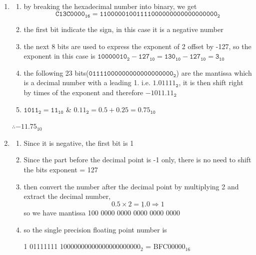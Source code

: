 \documentclass[12pt, a4paper]{article}
\begin{document}
\begin{ans}
    \begin{enumerate}
        \item \begin{enumerate}
                \item by breaking the hexadecimal number into binary, we get $$\mathtt{C13C0000_{16}}=\mathtt{1100 0001 0011 1100 0000 0000 0000 0000_2}$$
                \item the first bit indicate the sign, in this case it is a negative number
                \item the next 8 bits are used to express the exponent of 2 offset by -127, so the exponent in this case is $\mathtt{10000010_2 - 127_{10} = 130_{10} - 127_{10} = 3_{10}}$ 
                \item the following 23 bits($\mathtt{011 1100 0000 0000 0000 0000_2}$) are the mantissa which is a decimal number with a leading 1. i.e. $\mathtt{1.01111_2}$, it is then shift right by times of the exponent and therefore $\mathtt{-1011.11_2}$
                \item $\mathtt{1011_2 = 11_{10}}$ \& $\mathtt{0.11_2 = 0.5 + 0.25 = 0.75_{10}}$ 
            \end{enumerate}
            \begin{center}
                $\therefore-11.75_{10}$
            \end{center}
        \item \begin{enumerate}
                \item Since it is negative, the first bit is 1
                \item Since the part before the decimal point is -1 only, there is no need to shift the bits exponent = 127
                \item then convert the number after the decimal point by multiplying 2 and extract the decimal number, 
                        $$0.5 \times 2 = \underline{1}.0 \Rightarrow 1$$
                    so we have mantissa 100 0000 0000 0000 0000 0000
                \item so the single precision floating point number is
                    \begin{center}
                        1 01111111 10000000000000000000000$_2$ = BFC00000$_{16}$
                    \end{center}
            \end{enumerate}
    \end{enumerate}
\end{ans}
\end{document}
